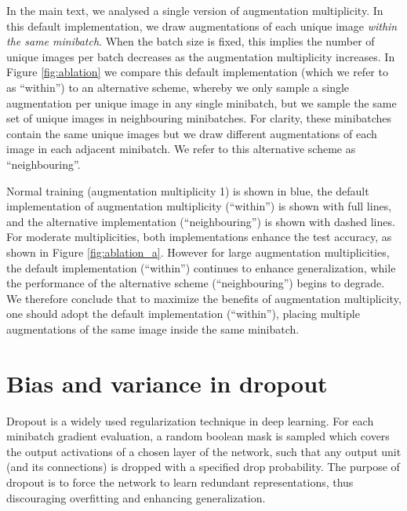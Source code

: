 \documentclass{article}
\begin{document}
In the main text, we analysed a single version of augmentation multiplicity. In this default implementation, we draw  augmentations of each unique image \textit{within the same minibatch}. When the batch size is fixed, this implies the number of unique images per batch decreases as the augmentation multiplicity increases. In Figure \ref{fig:ablation} we compare this default implementation (which we refer to as ``within'') to an alternative scheme, whereby we only sample a single augmentation per unique image in any single minibatch, but we sample the same set of unique images in  neighbouring minibatches. For clarity, these minibatches contain the same unique images but we draw different augmentations of each image in each adjacent minibatch. We refer to this alternative scheme as ``neighbouring''.

Normal training (augmentation multiplicity 1) is shown in blue, the default implementation of augmentation multiplicity (``within'') is shown with full lines, and the alternative implementation (``neighbouring'') is shown with dashed lines. For moderate multiplicities, both implementations enhance the test accuracy, as shown in Figure \ref{fig:ablation_a}. However for large augmentation multiplicities, the default implementation (``within'') continues to enhance generalization, while the performance of the alternative scheme (``neighbouring'') begins to degrade. We therefore conclude that to maximize the benefits of augmentation multiplicity, one should adopt the default implementation (``within''), placing multiple augmentations of the same image inside the same minibatch.

\section{Bias and variance in dropout}
\label{app:dropout}
Dropout \citep{srivastava2014dropout} is a widely used regularization technique in deep learning. For each minibatch gradient evaluation, a random boolean mask is sampled which covers the output activations of a chosen layer of the network, such that any output unit (and its connections) is dropped with a specified drop probability. The purpose of dropout is to force the network to learn redundant representations, thus discouraging overfitting and enhancing generalization.
\end{document}
